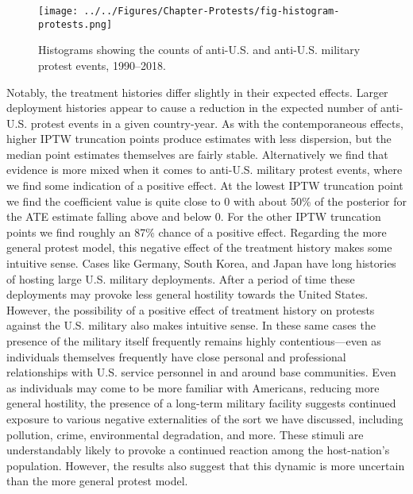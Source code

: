 \begin{figure}[t]
	\centering\texttt{[image: ../../Figures/Chapter-Protests/fig-histogram-protests.png]}
	\caption{Histograms showing the counts of anti-U.S. and anti-U.S. military protest events, 1990--2018.}
	\label{fig:protesthistograms}
\end{figure}


Notably, the treatment histories differ slightly in their expected effects. Larger deployment histories appear to cause a reduction in the expected number of anti-U.S. protest events in a given country-year. As with the contemporaneous effects, higher IPTW truncation points produce estimates with less dispersion, but the median point estimates themselves are fairly stable. Alternatively we find that evidence is more mixed when it comes to anti-U.S. military protest events, where we find some indication of a positive effect. At the lowest IPTW truncation point we find the coefficient value is quite close to 0 with about 50\% of the posterior for the ATE estimate falling above and below 0. For the other IPTW truncation points we find roughly an 87\% chance of a positive effect. Regarding the more general protest model, this negative effect of the treatment history makes some intuitive sense. Cases like Germany, South Korea, and Japan have long histories of hosting large U.S. military deployments. After a period of time these deployments may provoke less general hostility towards the United States. However, the possibility of a positive effect of treatment history on protests against the U.S. military also makes intuitive sense. In these same cases the presence of the military itself frequently remains highly contentious---even as individuals themselves frequently have close personal and professional relationships with U.S. service personnel in and around base communities. Even as individuals may come to be more familiar with Americans, reducing more general hostility, the presence of a long-term military facility suggests continued exposure to various negative externalities of the sort we have discussed, including pollution, crime, environmental degradation, and more. These stimuli are understandably likely to provoke a continued reaction among the host-nation's population. However, the results also suggest that this dynamic is more uncertain than the more general protest model.



